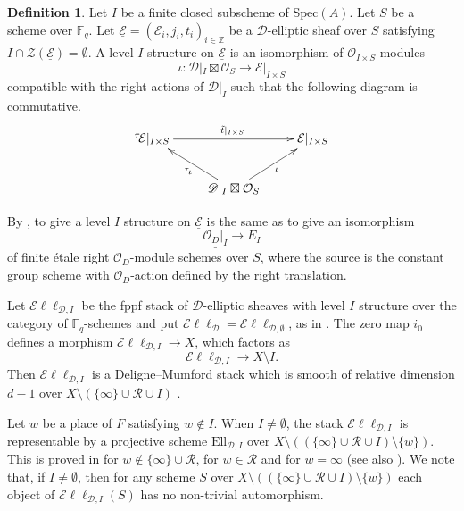 \documentclass[10pt]{amsart}
\theoremstyle{plain}
\theoremstyle{definition}
\newtheorem{dfn}[thm]{Definition}
\newcommand{\Spec}{\mathrm{Spec}}
\newcommand{\cE}{\mathcal{E}}
\newcommand{\cO}{\mathcal{O}}
\newcommand{\cR}{\mathcal{R}}
\newcommand{\cZ}{\mathcal{Z}}
\newcommand{\sEll}{\mathscr{E}\ell\ell}
\newcommand{\Ell}{\mathrm{Ell}}
\newcommand{\ucE}{\underline{\mathcal{E}}}
\newcommand{\bF}{\mathbb{F}}
\newcommand{\bZ}{\mathbb{Z}}
\newcommand{\sD}{\mathscr{D}}
\begin{document}
\begin{dfn}
	Let $I$ be a finite closed subscheme of $\Spec(A)$. 
	Let $S$ be a scheme over $\bF_q$.
	Let $\underline{\cE}=(\cE_i,j_i,t_i)_{i\in \bZ}$ be a $\sD$-elliptic sheaf over $S$ 
	satisfying $I\cap \cZ(\ucE)=\emptyset$. A level $I$ structure on $\underline{\cE}$ is an isomorphism of 
	$\cO_{I\times S}$-modules 
	\[
	\iota: \sD|_I\boxtimes \cO_S\to \cE|_{I\times S}
	\]
	compatible with the right actions of $ \sD|_I$ such that the following diagram is commutative.
	\[
	\xymatrix{
		{}^\tau\!\cE|_{I\times S}\ar[rr]^{\tilde{t}|_{I\times S}} & & \cE|_{I\times S}\\
		& \sD|_I\boxtimes \cO_S \ar[lu]^{{}^\tau\!\iota} \ar[ru]_\iota&
	}
	\]
\end{dfn}

By \cite[Proposition 2.1]{Dri_F}, to give a level $I$ structure on $\ucE$ is the same as to give an isomorphism 
\[
\underline{\cO_D|_I}\to E_I
\]
of finite \'{e}tale right $\cO_D$-module schemes over $S$, where the source is the constant group scheme
with $\cO_D$-action defined by the right translation.

Let $\sEll_{\sD,I}$ be the fppf stack of $\sD$-elliptic sheaves with level $I$ structure over the category of $\bF_q$-schemes and 
put $\sEll_{\sD}=\sEll_{\sD,\emptyset}$, as in \cite[\S2]{LRS}.
The zero map $i_{0}$ defines a morphism
$\sEll_{\sD,I}\to X$, which factors as
\begin{equation}\label{EqnStrMap}
\sEll_{\sD,I}\to X\setminus I.
\end{equation}
Then $\sEll_{\sD,I}$ is a Deligne--Mumford stack which is smooth of relative dimension $d-1$ over $X\setminus (\{\infty\}\cup \cR \cup I)$
\cite[Theorem 4.1]{LRS}. 

Let $w$ be a place of $F$ satisfying $w\notin I$.
When $I\neq \emptyset$, the stack $\sEll_{\sD,I}$ is representable by a projective scheme 
$\Ell_{\sD,I}$ over $X\setminus ((\{\infty\}\cup \cR \cup I)\setminus\{w\})$.
This is proved in \cite[Corollary 6.2]{LRS} for $w\notin \{\infty\}\cup \cR$, \cite[Th\'{e}or\`{e}me 6.4]{Hau} for $w\in \cR$ and \cite[Theorem 4.4.8 and 
Theorem 
4.4.9]{BS}
for $w=\infty$ (see also \cite[Remark 4.12]{Spi}).
We note that, if $I\neq \emptyset$, then for any scheme $S$ over $X\setminus ((\{\infty\}\cup \cR \cup I)\setminus\{w\})$ 
each object of $\sEll_{\sD,I}(S)$ has no non-trivial automorphism.






\end{document}
